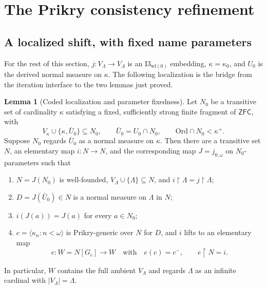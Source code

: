 \documentclass[11pt,letterpaper]{article}
\theoremstyle{definition}
\newtheorem{lemma}[definition]{Lemma}
\newcommand{\ZFC}{\mathsf{ZFC}}
\newcommand{\Ord}{\mathrm{Ord}}
\newcommand{\restr}{\mathbin{\upharpoonright}}
\newcommand{\Iwf}{\mathrm{I3}_{\mathrm{wf}(0)}}
\newcommand{\seq}[1]{\langle #1\rangle}
\begin{document}
\section{The Prikry consistency refinement}\label{sec:forcing}

\subsection{A localized shift, with fixed name parameters}

For the rest of this section, $j:V_\Lambda\to V_\Lambda$ is an $\Iwf$
embedding, $\kappa=\kappa_0$, and $U_0$ is the derived normal measure on
$\kappa$. The following localization is the bridge from the iteration
interface to the two lemmas just proved.

\Needspace{230pt}
\begin{lemma}[Coded localization and parameter fixedness]\label{lem:localize}
Let $N_0$ be a transitive set of cardinality $\kappa$ satisfying a fixed,
sufficiently strong finite fragment of $\ZFC$, with
\[
 V_\kappa\cup\{\kappa,\bar U_0\}\subseteq N_0,
 \qquad \bar U_0=U_0\cap N_0,
 \qquad \Ord\cap N_0<\kappa^+.
\]
Suppose $N_0$ regards $\bar U_0$ as a normal measure on $\kappa$.
Then there are a transitive set $N$, an elementary map $i:N\to N$,
and the corresponding map $J=j_{0,\omega}$ on $N_0$-parameters such that
\begin{enumerate}
\item $N=J(N_0)$ is well-founded,
$V_\Lambda\cup\{\Lambda\}\subseteq N$, and
$i\restr\Lambda=j\restr\Lambda$;
\item $D=J(\bar U_0)\in N$ is a normal measure on $\Lambda$ in $N$;
\item $i(J(a))=J(a)$ for every $a\in N_0$;
\item $c=\seq{\kappa_n:n<\omega}$ is Prikry-generic over $N$ for
$D$, and $i$ lifts to an elementary map
\[
 e:W=N[G_c]\longrightarrow W
 \quad\text{with}\quad e(c)=c^-,\qquad e\restr N=i.
\]
\end{enumerate}
In particular, $W$ contains the full ambient $V_\Lambda$ and regards
$\Lambda$ as an infinite cardinal with $|V_\Lambda|=\Lambda$.
\end{lemma}
\end{document}
